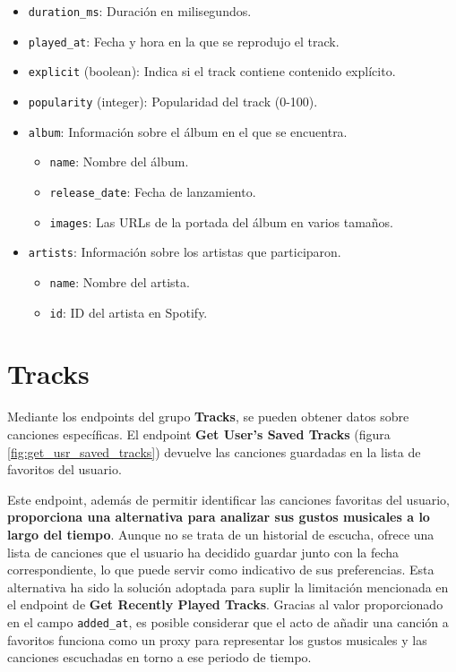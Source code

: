 \begin{itemize}
\begin{itemize}
\begin{itemize}
                        \item \texttt{duration\_ms}: Duración en milisegundos.
                        \item \texttt{played\_at}: Fecha y hora en la que se reprodujo el track.
                        \item \texttt{explicit} (boolean): Indica si el track contiene contenido explícito.
                        \item \texttt{popularity} (integer): Popularidad del track (0-100).
                        \item \texttt{album}: Información sobre el álbum en el que se encuentra.
                              \begin{itemize}
                                  \item \texttt{name}: Nombre del álbum.
                                  \item \texttt{release\_date}: Fecha de lanzamiento.
                                  \item \texttt{images}: Las URLs de la portada del álbum en varios tamaños.
                              \end{itemize}
                        \item \texttt{artists}: Información sobre los artistas que participaron.
                              \begin{itemize}
                                  \item \texttt{name}: Nombre del artista.
                                  \item \texttt{id}: ID del artista en Spotify.
                              \end{itemize}
                    \end{itemize}
          \end{itemize}
\end{itemize}

\section*{Tracks}

Mediante los endpoints del grupo \textbf{Tracks}, se pueden obtener datos sobre canciones específicas. El endpoint \textbf{Get User's Saved Tracks} (figura \ref{fig:get_usr_saved_tracks}) devuelve las canciones guardadas en la lista de favoritos del usuario.

Este endpoint, además de permitir identificar las canciones favoritas del usuario, \textbf{proporciona una alternativa para analizar sus gustos musicales a lo largo del tiempo}. Aunque no se trata de un historial de escucha, ofrece una lista de canciones que el usuario ha decidido guardar junto con la fecha correspondiente, lo que puede servir como indicativo de sus preferencias. Esta alternativa ha sido la solución adoptada para suplir la limitación mencionada en el endpoint de \textbf{Get Recently Played Tracks}. Gracias al valor proporcionado en el campo \texttt{added\_at}, es posible considerar que el acto de añadir una canción a favoritos funciona como un proxy para representar los gustos musicales y las canciones escuchadas en torno a ese periodo de tiempo.

